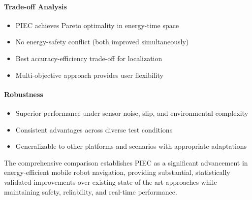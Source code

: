 \paragraph{Trade-off Analysis}
\begin{itemize}
    \item PIEC achieves Pareto optimality in energy-time space
    \item No energy-safety conflict (both improved simultaneously)
    \item Best accuracy-efficiency trade-off for localization
    \item Multi-objective approach provides user flexibility
\end{itemize}

\paragraph{Robustness}
\begin{itemize}
    \item Superior performance under sensor noise, slip, and environmental complexity
    \item Consistent advantages across diverse test conditions
    \item Generalizable to other platforms and scenarios with appropriate adaptations
\end{itemize}

The comprehensive comparison establishes PIEC as a significant advancement in energy-efficient mobile robot navigation, providing substantial, statistically validated improvements over existing state-of-the-art approaches while maintaining safety, reliability, and real-time performance.
